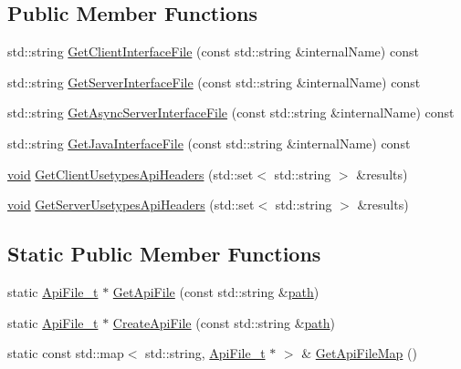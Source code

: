 \subsection*{Public Member Functions}
\begin{DoxyCompactItemize}
\item 
std\+::string \hyperlink{struct_api_file__t_a5301fe03fbf761cd20836f13569eb6a3}{Get\+Client\+Interface\+File} (const std\+::string \&internal\+Name) const 
\item 
std\+::string \hyperlink{struct_api_file__t_a7db0ee4ba2d71dada4ae68013debb9d6}{Get\+Server\+Interface\+File} (const std\+::string \&internal\+Name) const 
\item 
std\+::string \hyperlink{struct_api_file__t_ab230cc292235c1c41775fbb67151294f}{Get\+Async\+Server\+Interface\+File} (const std\+::string \&internal\+Name) const 
\item 
std\+::string \hyperlink{struct_api_file__t_a1e0ed6f88acc0566fbb13e7716175827}{Get\+Java\+Interface\+File} (const std\+::string \&internal\+Name) const 
\item 
\hyperlink{_t_e_m_p_l_a_t_e__cdef_8h_ac9c84fa68bbad002983e35ce3663c686}{void} \hyperlink{struct_api_file__t_a1a8a46b2fbe87a80d3daa36334fff37c}{Get\+Client\+Usetypes\+Api\+Headers} (std\+::set$<$ std\+::string $>$ \&results)
\item 
\hyperlink{_t_e_m_p_l_a_t_e__cdef_8h_ac9c84fa68bbad002983e35ce3663c686}{void} \hyperlink{struct_api_file__t_a9153fdf370ee5b6d8d5ebf927bce0944}{Get\+Server\+Usetypes\+Api\+Headers} (std\+::set$<$ std\+::string $>$ \&results)
\end{DoxyCompactItemize}
\subsection*{Static Public Member Functions}
\begin{DoxyCompactItemize}
\item 
static \hyperlink{struct_api_file__t}{Api\+File\+\_\+t} $\ast$ \hyperlink{struct_api_file__t_a4088bf09ac233b3c6ff1ac40ca1504c7}{Get\+Api\+File} (const std\+::string \&\hyperlink{struct_api_file__t_a1bae4c510119f193e9466cfe7e3c50d1}{path})
\item 
static \hyperlink{struct_api_file__t}{Api\+File\+\_\+t} $\ast$ \hyperlink{struct_api_file__t_a18905bfc696c827028195914a599770a}{Create\+Api\+File} (const std\+::string \&\hyperlink{struct_api_file__t_a1bae4c510119f193e9466cfe7e3c50d1}{path})
\item 
static const std\+::map$<$ std\+::string, \hyperlink{struct_api_file__t}{Api\+File\+\_\+t} $\ast$ $>$ \& \hyperlink{struct_api_file__t_a3e6c150076de4251274688ffb1eb63de}{Get\+Api\+File\+Map} ()
\end{DoxyCompactItemize}
